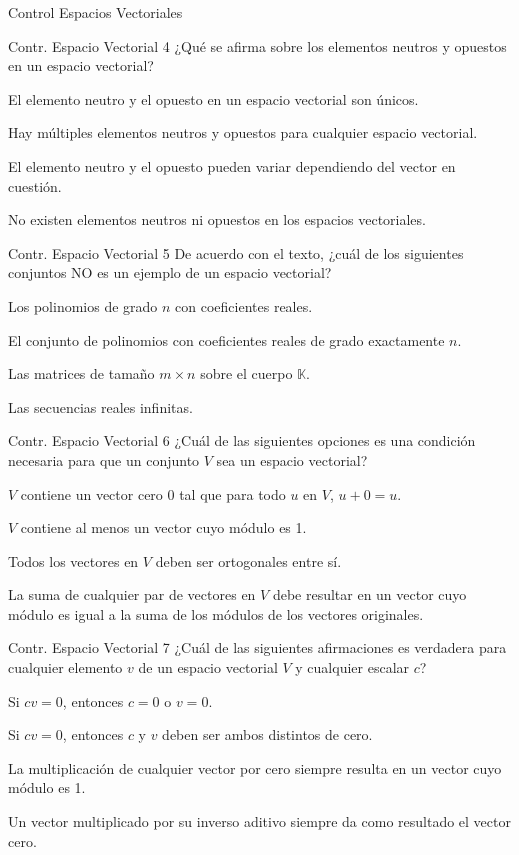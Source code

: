 \documentclass[a4,11pt]{aleph-notas}
\begin{document}
\begin{quiz}{Control Espacios Vectoriales}
\begin{multi}{Contr. Espacio Vectorial 4}%
    {¿Qué se afirma sobre los elementos neutros y opuestos en un espacio vectorial?}
    \item* El elemento neutro y el opuesto en un espacio vectorial son únicos.
    \item Hay múltiples elementos neutros y opuestos para cualquier espacio vectorial.
    \item El elemento neutro y el opuesto pueden variar dependiendo del vector en cuestión.
    \item No existen elementos neutros ni opuestos en los espacios vectoriales.
\end{multi}

\begin{multi}{Contr. Espacio Vectorial 5}%
    {De acuerdo con el texto, ¿cuál de los siguientes conjuntos NO es un ejemplo de un espacio vectorial?}
    \item Los polinomios de grado $n$ con coeficientes reales.
    \item* El conjunto de polinomios con coeficientes reales de grado exactamente $n$.
    \item Las matrices de tamaño $m\times n$ sobre el cuerpo $\mathbb{K}$.
    \item Las secuencias reales infinitas.
\end{multi}

\begin{multi}{Contr. Espacio Vectorial 6}%
    {¿Cuál de las siguientes opciones es una condición necesaria para que un conjunto $V$ sea un espacio vectorial?}
    \item* $V$ contiene un vector cero \(0\) tal que para todo \(u\) en \(V\), \(u + 0 = u\).
    \item $V$ contiene al menos un vector cuyo módulo es 1.
    \item Todos los vectores en $V$ deben ser ortogonales entre sí.
    \item La suma de cualquier par de vectores en $V$ debe resultar en un vector cuyo módulo es igual a la suma de los módulos de los vectores originales.
\end{multi}


\begin{multi}{Contr. Espacio Vectorial 7}%
    {¿Cuál de las siguientes afirmaciones es verdadera para cualquier elemento \(v\) de un espacio vectorial \(V\) y cualquier escalar \(c\)?}
    \item* Si \(cv = 0\), entonces \(c = 0\) o \(v = 0\).
    \item Si \(cv = 0\), entonces \(c\) y \(v\) deben ser ambos distintos de cero.
    \item La multiplicación de cualquier vector por cero siempre resulta en un vector cuyo módulo es 1.
    \item Un vector multiplicado por su inverso aditivo siempre da como resultado el vector cero.
\end{multi}


\end{quiz}
\end{document}
